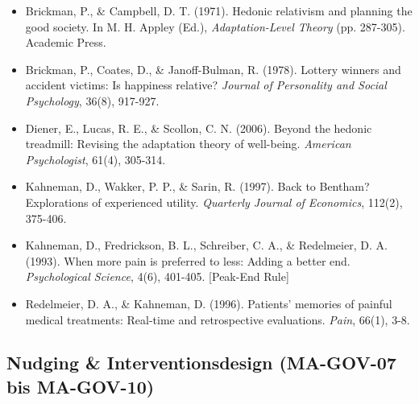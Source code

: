 \begin{itemize}[leftmargin=*]
    \item Brickman, P., \& Campbell, D. T. (1971). Hedonic relativism and planning the good society. In M. H. Appley (Ed.), \textit{Adaptation-Level Theory} (pp. 287-305). Academic Press.
    \item Brickman, P., Coates, D., \& Janoff-Bulman, R. (1978). Lottery winners and accident victims: Is happiness relative? \textit{Journal of Personality and Social Psychology}, 36(8), 917-927.
    \item Diener, E., Lucas, R. E., \& Scollon, C. N. (2006). Beyond the hedonic treadmill: Revising the adaptation theory of well-being. \textit{American Psychologist}, 61(4), 305-314.
    \item Kahneman, D., Wakker, P. P., \& Sarin, R. (1997). Back to Bentham? Explorations of experienced utility. \textit{Quarterly Journal of Economics}, 112(2), 375-406.
    \item Kahneman, D., Fredrickson, B. L., Schreiber, C. A., \& Redelmeier, D. A. (1993). When more pain is preferred to less: Adding a better end. \textit{Psychological Science}, 4(6), 401-405. [Peak-End Rule]
    \item Redelmeier, D. A., \& Kahneman, D. (1996). Patients' memories of painful medical treatments: Real-time and retrospective evaluations. \textit{Pain}, 66(1), 3-8.
\end{itemize}

\subsection*{Nudging \& Interventionsdesign (MA-GOV-07 bis MA-GOV-10)}


